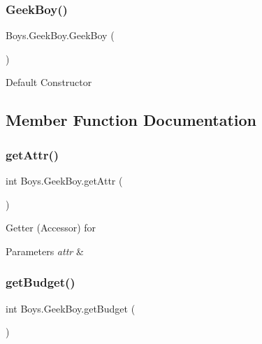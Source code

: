 \subsubsection{\texorpdfstring{Geek\+Boy()}{GeekBoy()}\hspace{0.1cm}{\footnotesize\ttfamily [2/2]}}
{\footnotesize\ttfamily Boys.\+Geek\+Boy.\+Geek\+Boy (\begin{DoxyParamCaption}{ }\end{DoxyParamCaption})\hspace{0.3cm}{\ttfamily [inline]}}

Default Constructor 

\subsection{Member Function Documentation}
\mbox{\label{class_boys_1_1_geek_boy_ad52b4fd950d0b9ff44315fedfba7ef55}} 
\subsubsection{\texorpdfstring{get\+Attr()}{getAttr()}}
{\footnotesize\ttfamily int Boys.\+Geek\+Boy.\+get\+Attr (\begin{DoxyParamCaption}{ }\end{DoxyParamCaption})\hspace{0.3cm}{\ttfamily [inline]}}

Getter (Accessor) for 
\begin{DoxyParams}{Parameters}
{\em attr} & \\
\hline
\end{DoxyParams}
\mbox{\label{class_boys_1_1_geek_boy_a606fcc046649afa5907fd00e9c301ec2}} 
\subsubsection{\texorpdfstring{get\+Budget()}{getBudget()}}
{\footnotesize\ttfamily int Boys.\+Geek\+Boy.\+get\+Budget (\begin{DoxyParamCaption}{ }\end{DoxyParamCaption})\hspace{0.3cm}{\ttfamily [inline]}}

